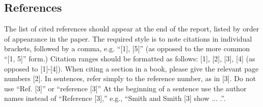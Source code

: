 \documentclass[10pt,journal,compsoc]{IEEEtran}
\begin{document}
%
%

%
%

\subsection{References}
The list of cited references should appear at the end of the report, listed by order of appearance in the paper. The required style is to note citations in individual brackets, followed by a comma, e.g. “[1], [5]” (as opposed to the more common “[1, 5]” form.) Citation ranges should be formatted as follows: [1], [2], [3], [4] (as opposed to [1]-[4]). When citing a section in a book, please give the relevant page numbers [2]. In sentences, refer simply to the reference number, as in [3]. Do not use “Ref. [3]” or “reference [3]” At the beginning of a sentence use the author names instead of “Reference [3],” e.g., “Smith and Smith [3] show ... .”. 
\end{document}
